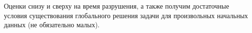 Оценки снизу и сверху на время разрушения, а также получим достаточные условия существования глобального решения задачи для произвольных начальных данных (не обязательно малых).




%

%

